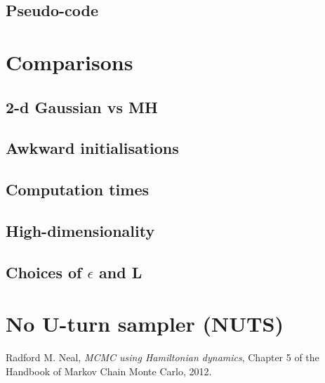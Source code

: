 \documentclass[12pt]{article}
\begin{document}
\subsection{Pseudo-code}

\section{Comparisons}
\subsection{2-d Gaussian vs MH}
\subsection{Awkward initialisations}
\subsection{Computation times}
\subsection{High-dimensionality}
\subsection{Choices of $\epsilon$ and L}

\section{No U-turn sampler (NUTS)}

\begin{thebibliography}{9}

  Radford M. Neal,
  \emph{MCMC using Hamiltonian dynamics},
  Chapter 5 of the Handbook of Markov Chain Monte Carlo,
  2012.

\end{thebibliography}
\end{document}
